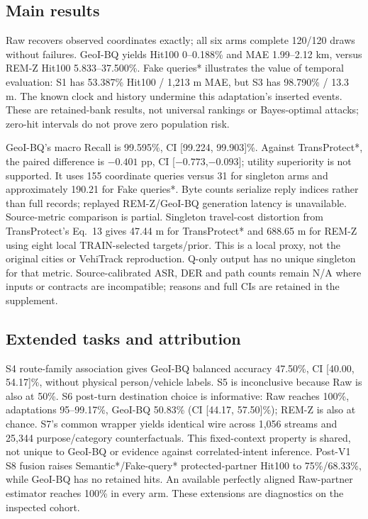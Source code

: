 \subsection{Main results}


Raw recovers observed coordinates exactly; all six arms complete 120/120 draws
without failures. GeoI-BQ yields Hit100 0--0.188\% and MAE 1.99--2.12 km,
versus REM-Z Hit100 5.833--37.500\%.
Fake queries* illustrates the value of temporal evaluation: S1 has
53.387\% Hit100 / 1,213 m MAE, but S3 has 98.790\% / 13.3 m.
The known clock and history undermine this adaptation's inserted events.
These are retained-bank results, not universal rankings or Bayes-optimal attacks;
zero-hit intervals do not prove zero population risk.

GeoI-BQ's macro Recall is 99.595\%, CI [99.224, 99.903]\%.
Against TransProtect*, the paired difference is $-0.401$ pp,
CI [$-0.773$,$-0.093$]; utility superiority is not supported.
It uses 155 coordinate queries versus 31 for singleton arms and approximately
190.21 for Fake queries*. Byte counts serialize reply indices rather than full
records; replayed REM-Z/GeoI-BQ generation latency is unavailable.
Source-metric comparison is partial. Singleton travel-cost distortion from
TransProtect's Eq.~13 gives 47.44 m for TransProtect* and 688.65 m for REM-Z
using eight local TRAIN-selected targets/prior. This is a local proxy, not the
original cities or VehiTrack reproduction. Q-only output has no unique
singleton for that metric. Source-calibrated ASR, DER and path counts remain
N/A where inputs or contracts are incompatible; reasons and full CIs are retained
in the supplement.

\subsection{Extended tasks and attribution}
S4 route-family association gives GeoI-BQ balanced accuracy 47.50\%,
CI [40.00, 54.17]\%, without physical person/vehicle labels.
S5 is inconclusive because Raw is also at 50\%.
S6 post-turn destination choice is informative: Raw reaches 100\%,
adaptations 95--99.17\%, GeoI-BQ 50.83\%
(CI [44.17, 57.50]\%); REM-Z is also at chance.
S7's common wrapper yields identical wire across 1,056 streams and 25,344
purpose/category counterfactuals. This fixed-context property is shared,
not unique to GeoI-BQ or evidence against correlated-intent inference.
Post-V1 S8 fusion raises Semantic*/Fake-query* protected-partner Hit100 to
75\%/68.33\%, while GeoI-BQ has no retained hits.
An available perfectly aligned Raw-partner estimator reaches 100\% in every arm.
These extensions are diagnostics on the inspected cohort.


